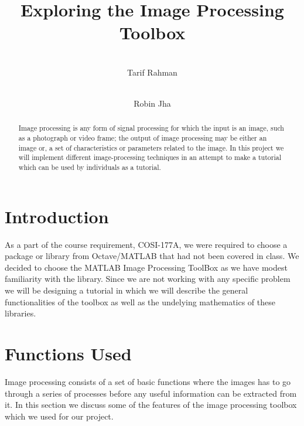 \documentclass[12pt]{article}
\title{Exploring the Image Processing Toolbox}
\author{
   \\Tarif Rahman
  \and
    \\Robin Jha}
\begin{document}
\maketitle
\hspace {1 cm}
\begin{abstract}
Image processing is any form of signal processing for which the input is an image, such as a photograph or video frame;
 the output of image processing may be either an image or, a set of characteristics or parameters related to the image.
 In this project we will implement different image-processing techniques in an attempt to make a tutorial which can be used 
by individuals as a tutorial.
  \end{abstract}
  \section{Introduction}
   As a part of the course requirement, COSI-177A, we were required to choose a package or library from Octave/MATLAB
that had not been covered in class. We decided to choose the MATLAB Image Processing ToolBox as we have modest familiarity with the library. Since we are not working with any specific problem we will be designing a tutorial in which we will describe the general functionalities of the toolbox as well as the undelying mathematics of these libraries.    
  \section{Functions Used}
    Image processing consists of a set of basic functions where the images has to go through a series of processes before any useful information can be extracted from it. In this section we discuss some of the features of the image processing toolbox which we used for our project.
\end{document}
